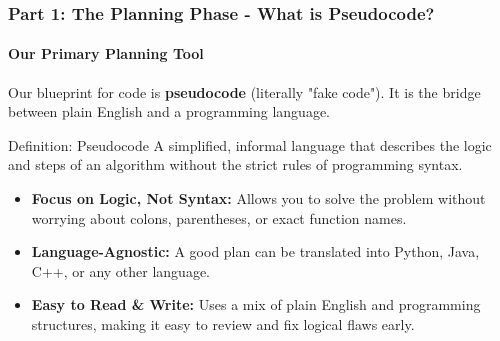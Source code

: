 \documentclass{beamer}
\begin{document}
\begin{frame}[fragile]
    \frametitle{Part 1: The Planning Phase - What is Pseudocode?}
    \framesubtitle{Our Primary Planning Tool}

    Our blueprint for code is \textbf{pseudocode} (literally "fake code"). It is the bridge between plain English and a programming language.

    \begin{block}{Definition: Pseudocode}
        A simplified, informal language that describes the logic and steps of an algorithm without the strict rules of programming syntax.
    \end{block}

    \begin{itemize}
        \item<1-> \textbf{Focus on Logic, Not Syntax:} Allows you to solve the problem without worrying about colons, parentheses, or exact function names.
        \item<2-> \textbf{Language-Agnostic:} A good plan can be translated into Python, Java, C++, or any other language.
        \item<3-> \textbf{Easy to Read \& Write:} Uses a mix of plain English and programming structures, making it easy to review and fix logical flaws early.
    \end{itemize}
\end{frame}
\end{document}
